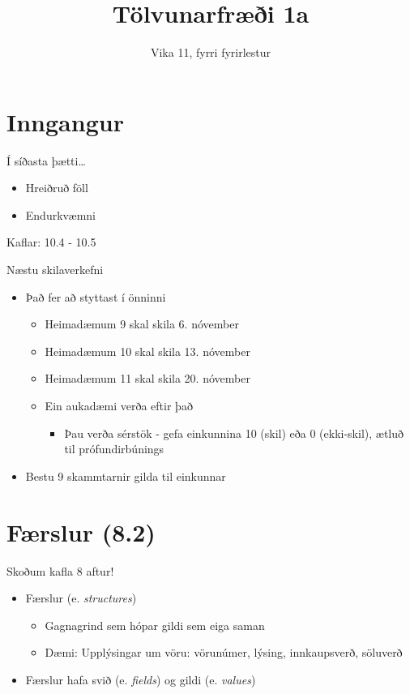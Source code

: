 \documentclass{beamer}
\title{Tölvunarfræði 1a}
\subtitle{Vika 11, fyrri fyrirlestur}
\begin{document}
\begin{frame}
\titlepage
\end{frame}

\section{Inngangur}

\begin{frame}{Í síðasta þætti\ldots}
\begin{itemize}
 \item Hreiðruð föll
 \item Endurkvæmni
\end{itemize}
Kaflar: 10.4 - 10.5
\end{frame}

\begin{frame}{Næstu skilaverkefni}
\begin{itemize}
 \item Það fer að styttast í önninni
 \begin{itemize}
  \item Heimadæmum 9 skal skila 6. nóvember
  \item Heimadæmum 10 skal skila 13. nóvember
  \item Heimadæmum 11 skal skila 20. nóvember
  \item Ein aukadæmi verða eftir það
  \begin{itemize}
   \item Þau verða sérstök - gefa einkunnina 10 (skil) eða 0 (ekki-skil), ætluð til prófundirbúnings
  \end{itemize}
 \end{itemize}
 \item Bestu 9 skammtarnir gilda til einkunnar
\end{itemize}
\end{frame}

\section{Færslur (8.2)}

\begin{frame}{Skoðum kafla 8 aftur!}
\begin{itemize}
 \item Færslur (e. \emph{structures})
 \begin{itemize}
  \item Gagnagrind sem hópar gildi sem eiga saman
  \item Dæmi: Upplýsingar um vöru: vörunúmer, lýsing, innkaupsverð, söluverð
 \end{itemize}
 \item Færslur hafa svið (e. \emph{fields}) og gildi (e. \emph{values})
\end{itemize}
\end{frame}
\end{document}
